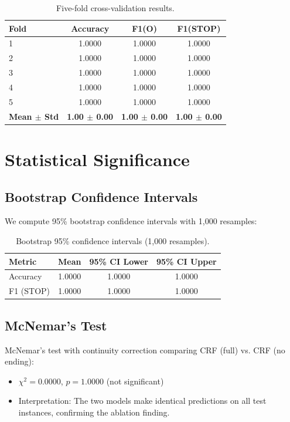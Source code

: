 \documentclass[12pt, a4paper, twoside]{report}
\begin{document}
\begin{table}[htbp]
\centering
\caption{Five-fold cross-validation results.}
\label{tab:cv}
\begin{tabular}{lccc}
\toprule
\textbf{Fold} & \textbf{Accuracy} & \textbf{F1(O)} & \textbf{F1(STOP)} \\
\midrule
1 & 1.0000 & 1.0000 & 1.0000 \\
2 & 1.0000 & 1.0000 & 1.0000 \\
3 & 1.0000 & 1.0000 & 1.0000 \\
4 & 1.0000 & 1.0000 & 1.0000 \\
5 & 1.0000 & 1.0000 & 1.0000 \\
\midrule
\textbf{Mean $\pm$ Std} & \textbf{1.00 $\pm$ 0.00} & \textbf{1.00 $\pm$ 0.00} & \textbf{1.00 $\pm$ 0.00} \\
\bottomrule
\end{tabular}
\end{table}

\section{Statistical Significance}
\label{sec:significance}

\subsection{Bootstrap Confidence Intervals}

We compute 95\% bootstrap confidence intervals with 1,000 resamples:

\begin{table}[htbp]
\centering
\caption{Bootstrap 95\% confidence intervals (1,000 resamples).}
\label{tab:bootstrap}
\begin{tabular}{lccc}
\toprule
\textbf{Metric} & \textbf{Mean} & \textbf{95\% CI Lower} & \textbf{95\% CI Upper} \\
\midrule
Accuracy & 1.0000 & 1.0000 & 1.0000 \\
F1 (STOP) & 1.0000 & 1.0000 & 1.0000 \\
\bottomrule
\end{tabular}
\end{table}

\subsection{McNemar's Test}

McNemar's test with continuity correction comparing CRF (full) vs. CRF (no ending):
\begin{itemize}
    \item $\chi^2 = 0.0000$, $p = 1.0000$ (not significant)
    \item Interpretation: The two models make identical predictions on all test instances, confirming the ablation finding.
\end{itemize}
\end{document}
